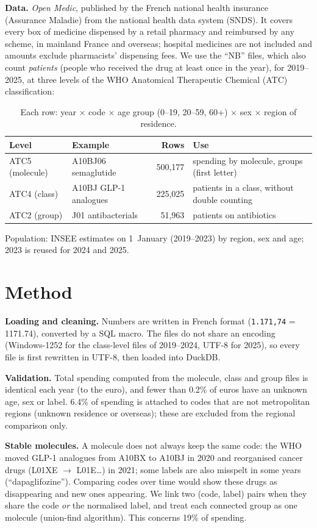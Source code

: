 \documentclass[11pt,a4paper]{article}
\begin{document}
\textbf{Data.} \emph{Open Medic}, published by the French national health insurance (Assurance Maladie) from the
national health data system (SNDS). It covers every box of medicine dispensed by a retail pharmacy and reimbursed by any
scheme, in mainland France and overseas; hospital medicines are not included and amounts exclude pharmacists' dispensing
fees. We use the ``NB'' files, which also count \emph{patients} (people who received the drug at least once in the year),
for 2019--2025, at three levels of the WHO Anatomical Therapeutic Chemical (ATC) classification:

\begin{table}[H]\centering\small
\begin{tabular}{llrl}\toprule
Level & Example & Rows & Use \\\midrule
ATC5 (molecule) & A10BJ06 semaglutide & 500{,}177 & spending by molecule, groups (first letter) \\
ATC4 (class) & A10BJ GLP-1 analogues & 225{,}025 & patients in a class, without double counting \\
ATC2 (group) & J01 antibacterials & 51{,}963 & patients on antibiotics \\\bottomrule
\end{tabular}
\caption{Each row: year $\times$ code $\times$ age group (0--19, 20--59, 60+) $\times$ sex $\times$ region of residence.}
\end{table}
Population: INSEE estimates on 1~January (2019--2023) by region, sex and age; 2023 is reused for 2024 and 2025.

\section{Method}
\textbf{Loading and cleaning.} Numbers are written in French format (\texttt{1.171,74} = 1171.74), converted by a SQL macro.
The files do not share an encoding (Windows-1252 for the class-level files of 2019--2024, UTF-8 for 2025), so every file
is first rewritten in UTF-8, then loaded into DuckDB.

\textbf{Validation.} Total spending computed from the molecule, class and group files is identical each year (to the euro),
and fewer than 0.2\% of euros have an unknown age, sex or label. 6.4\% of spending is attached to codes that are not
metropolitan regions (unknown residence or overseas); these are excluded from the regional comparison only.

\textbf{Stable molecules.} A molecule does not always keep the same code: the WHO moved GLP-1 analogues from A10BX to
A10BJ in 2020 and reorganised cancer drugs (L01XE $\rightarrow$ L01E\ldots) in 2021; some labels are also misspelt in
some years (``dapaglifozine''). Comparing codes over time would show these drugs as disappearing and new ones appearing.
We link two (code, label) pairs when they share the code \emph{or} the normalised label, and treat each connected group
as one molecule (union-find algorithm). This concerns 19\% of spending.
\end{document}
